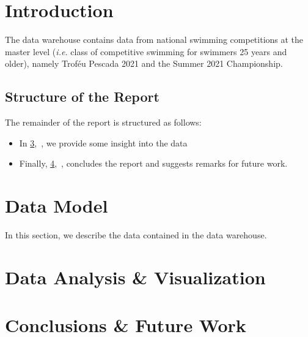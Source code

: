\documentclass[a4paper, 11pt]{article}
\begin{document}
\pagebreak

\tableofcontents \pagebreak
\listoffigures \pagebreak


\section{Introduction}\label{sec:introduction}

The data warehouse contains data from national swimming competitions at the master level (\textit{i.e.} class of
competitive swimming for swimmers 25 years and older), namely Troféu Pescada 2021 and the Summer 2021 Championship.

\subsection*{Structure of the Report}

The remainder of the report is structured as follows:

\begin{itemize}
    \item In \cref{sec:analysis},~\textbf{}, we provide some insight into the data
    \item Finally, \cref{sec:conclusion},~\textbf{}, concludes the report and suggests remarks
    for future work.
\end{itemize}

\pagebreak

\section{Data Model} \label{sec:data-model}

In this section, we describe the data contained in the data warehouse.

\pagebreak

\section{Data Analysis \& Visualization} \label{sec:analysis}


\pagebreak

\section{Conclusions \& Future Work} \label{sec:conclusion}
\end{document}
